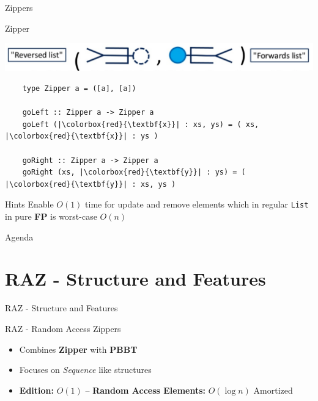 \documentclass{beamer}
\begin{document}
\begin{frame}[fragile]{Zippers}

 \begin{block}{Zipper}

  \begin{minipage}[t]{\linewidth}
    \includegraphics[width=\textwidth]{zipper_1}
  \end{minipage}

  \begin{verbatim}
    type Zipper a = ([a], [a])

    goLeft :: Zipper a -> Zipper a
    goLeft (|\colorbox{red}{\textbf{x}}| : xs, ys) = ( xs, |\colorbox{red}{\textbf{x}}| : ys )

    goRight :: Zipper a -> Zipper a
    goRight (xs, |\colorbox{red}{\textbf{y}}| : ys) = ( |\colorbox{red}{\textbf{y}}| : xs, ys )
  \end{verbatim}


\end{block}

\begin{block}{Hints}
  Enable \textbf{$O(1)$} time for update and remove elements which in regular \texttt{List} in pure \textbf{FP} is worst-case $O(n)$
\end{block}
\end{frame}

\begin{frame}{Agenda}
  \section{RAZ - Structure and Features}
  \tableofcontents[currentsection]
\end{frame}

\begin{frame}[fragile]{RAZ - Structure and Features}

  \begin{block}{RAZ - Random Access Zippers}
    \begin{itemize}
      \item Combines \textbf{Zipper} with \textbf{PBBT}
      \item Focuses on \textit{Sequence} like structures
      \item \textbf{Edition:} $O(1)$ -- \textbf{Random Access Elements:} $O(\log{n})$ Amortized
    \end{itemize}
  \end{block}

\end{frame}
\end{document}
